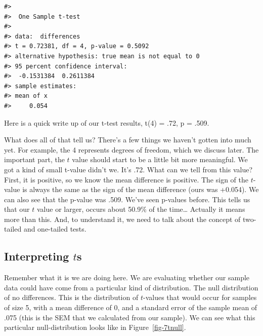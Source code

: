 \documentclass[
  letterpaper,
  DIV=11,
  numbers=noendperiod]{scrreprt}
\begin{document}
\begin{verbatim}
#> 
#>  One Sample t-test
#> 
#> data:  differences
#> t = 0.72381, df = 4, p-value = 0.5092
#> alternative hypothesis: true mean is not equal to 0
#> 95 percent confidence interval:
#>  -0.1531384  0.2611384
#> sample estimates:
#> mean of x 
#>     0.054
\end{verbatim}

Here is a quick write up of our t-test results, t(4) = .72, p = .509.

What does all of that tell us? There's a few things we haven't gotten
into much yet. For example, the 4 represents degrees of freedom, which
we discuss later. The important part, the \(t\) value should start to be
a little bit more meaningful. We got a kind of small t-value didn't we.
It's .72. What can we tell from this value? First, it is positive, so we
know the mean difference is positive. The sign of the \(t\)-value is
always the same as the sign of the mean difference (ours was +0.054). We
can also see that the p-value was .509. We've seen p-values before. This
tells us that our \(t\) value or larger, occurs about 50.9\% of the
time\ldots{} Actually it means more than this. And, to understand it, we
need to talk about the concept of two-tailed and one-tailed tests.

\subsection{\texorpdfstring{Interpreting
\(t\)s}{Interpreting ts}}\label{interpreting-ts}

Remember what it is we are doing here. We are evaluating whether our
sample data could have come from a particular kind of distribution. The
null distribution of no differences. This is the distribution of
\(t\)-values that would occur for samples of size 5, with a mean
difference of 0, and a standard error of the sample mean of .075 (this
is the SEM that we calculated from our sample). We can see what this
particular null-distribution looks like in Figure~\ref{fig-7tnull}.
\end{document}
